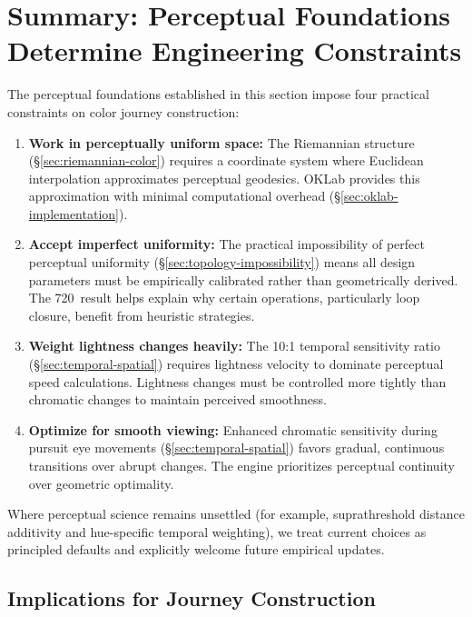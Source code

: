 \section{Summary: Perceptual Foundations Determine Engineering Constraints}
\label{sec:perceptual-summary}

The perceptual foundations established in this section impose four practical constraints on color journey construction:

\begin{enumerate}
    \item \textbf{Work in perceptually uniform space:} The Riemannian structure (\S\ref{sec:riemannian-color}) requires a coordinate system where Euclidean interpolation approximates perceptual geodesics. OKLab provides this approximation with minimal computational overhead (\S\ref{sec:oklab-implementation}).
    
    \item \textbf{Accept imperfect uniformity:} The practical impossibility of perfect perceptual uniformity (\S\ref{sec:topology-impossibility}) means all design parameters must be empirically calibrated rather than geometrically derived. The 720\textdegree\ result helps explain why certain operations, particularly loop closure, benefit from heuristic strategies.
    
    \item \textbf{Weight lightness changes heavily:} The 10:1 temporal sensitivity ratio (\S\ref{sec:temporal-spatial}) requires lightness velocity to dominate perceptual speed calculations. Lightness changes must be controlled more tightly than chromatic changes to maintain perceived smoothness.
    
    \item \textbf{Optimize for smooth viewing:} Enhanced chromatic sensitivity during pursuit eye movements (\S\ref{sec:temporal-spatial}) favors gradual, continuous transitions over abrupt changes. The engine prioritizes perceptual continuity over geometric optimality.
\end{enumerate}

Where perceptual science remains unsettled (for example, suprathreshold distance additivity and hue-specific temporal weighting), we treat current choices as principled defaults and explicitly welcome future empirical updates.

\subsection{Implications for Journey Construction}

